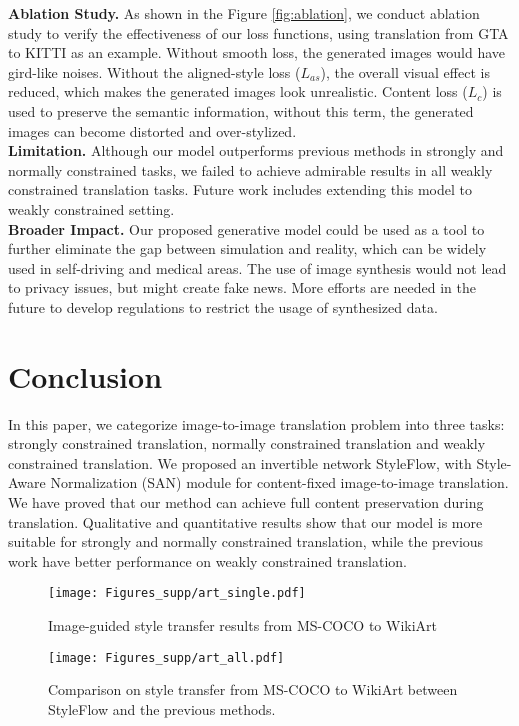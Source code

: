 \documentclass[runningheads]{llncs}
\begin{document}
\noindent \textbf{Ablation Study.}
As shown in the Figure \ref{fig:ablation}, we conduct ablation study to verify the effectiveness of our loss functions, using translation from GTA to KITTI as an example. Without smooth loss, the generated images would have gird-like noises. Without the aligned-style loss ($L_{as}$), the overall visual effect is reduced, which makes the generated images look unrealistic. Content loss ($L_c$) is used to preserve the semantic information, without this term, the generated images can become distorted and over-stylized.\\[0.5ex]
\noindent \textbf{Limitation.}
Although our model outperforms previous methods  in strongly and normally constrained tasks, we failed to achieve admirable results in all weakly constrained translation tasks. Future work includes extending this model to weakly constrained setting.\\[0.5ex]
\noindent \textbf{Broader Impact.}
Our proposed generative model could be used as a tool to further eliminate the gap between simulation and reality, which can be widely used in self-driving and medical areas. The use of image synthesis would not lead to privacy issues, but might create fake news. More efforts are needed in the future to develop regulations to restrict the usage of synthesized data.
\section{Conclusion}
In this paper, we categorize image-to-image translation problem into three tasks: strongly constrained translation, normally constrained translation and weakly constrained translation. We proposed an invertible network StyleFlow, with Style-Aware Normalization (SAN) module for content-fixed image-to-image translation. We have proved that our method can achieve full content preservation during translation. Qualitative and quantitative results show that our model is more suitable for strongly and normally constrained translation, while the previous work have better performance on weakly constrained translation.


\begin{figure*}
  \centering
  \texttt{[image: Figures\_supp/art\_single.pdf]}
  \caption{Image-guided style transfer results from MS-COCO\cite{lin2014microsoft} to WikiArt\cite{wikiart}}
  \label{fig:ars}
\end{figure*}

\begin{figure*}
  \centering
  \texttt{[image: Figures\_supp/art\_all.pdf]}
  \caption{Comparison on style transfer from MS-COCO\cite{lin2014microsoft} to WikiArt\cite{wikiart} between StyleFlow and the previous methods.}
  \label{fig:art_all}
\end{figure*}
\end{document}
